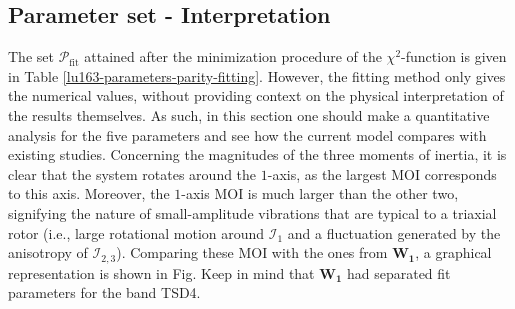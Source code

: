 \subsection{Parameter set - Interpretation}

The set $\mathcal{P}_\text{fit}$ attained after the minimization procedure of the $\chi^2$-function is given in Table \ref{lu163-parameters-parity-fitting}. However, the fitting method only gives the numerical values, without providing context on the physical interpretation of the results themselves. As such, in this section one should make a quantitative analysis for the five parameters and see how the current model compares with existing studies. Concerning the magnitudes of the three moments of inertia, it is clear that the system rotates around the $1$-axis, as the largest MOI corresponds to this axis. Moreover, the $1$-axis MOI is much larger than the other two, signifying the nature of small-amplitude vibrations that are typical to a triaxial rotor (i.e., large rotational motion around $\mathcal{I}_1$ and a fluctuation generated by the anisotropy of $\mathcal{I}_{2,3}$). Comparing these MOI with the ones from $\mathbf{W_1}$, a graphical representation is shown in Fig. Keep in mind that $\mathbf{W_1}$ had separated fit parameters for the band TSD4.